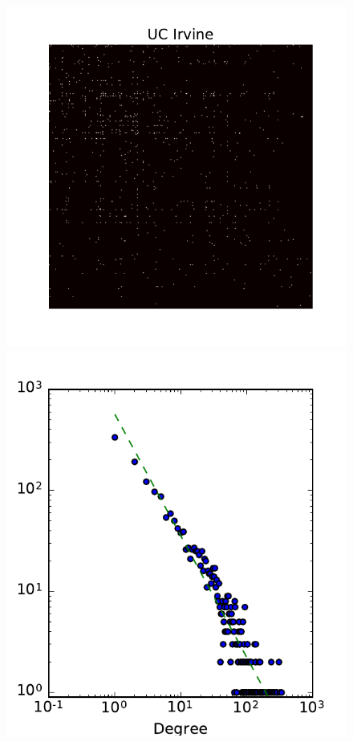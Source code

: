 \begin{figure}[h]
	\centering
	

	\includegraphics[scale=0.4]{img/irvine}
	\endminipage
	\includegraphics[scale=0.4]{img/irvine_d}

\end{figure}

